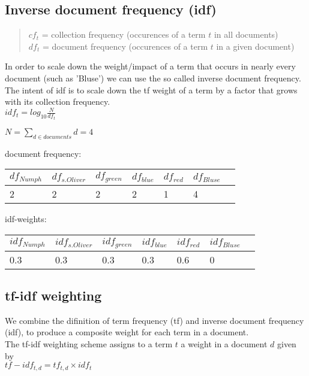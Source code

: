 \subsection{Inverse document frequency (idf)}
\begin{quote}
    $cf_t$ = collection frequency (occurences of a term $t$ in all documents)\\
    $df_t$ = document frequency (occurences of a term $t$ in a given document)
\end{quote}
In order to scale down the weight/impact of a term that occurs in nearly every document (such as 'Bluse') we can use the so called inverse document frequency.\\
The intent of idf is to scale down the tf weight of a term by a factor that grows with its collection frequency.\\

$idf_t = log_{10}\frac{N}{df_{t}}$

\bigskip
$N = \displaystyle\sum_{d \in documents}{d} = 4$

\bigskip
\noindent
document frequency:\\
\begin{tabular}{ l l l l l l l }
    \textbf{$df_{Numph}$} & \textbf{$df_{s.Oliver}$} & \textbf{$df_{green}$} & \textbf{$df_{blue}$} & \textbf{$df_{red}$} & \textbf{$df_{Bluse}$}\\\hline
    2                     & 2                        & 2                     & 2                    & 1                   & 4\\
\end{tabular}

\bigskip
\noindent
idf-weights:\\
\begin{tabular}{ l l l l l l l }
    \textbf{$idf_{Numph}$} & \textbf{$idf_{s.Oliver}$} & \textbf{$idf_{green}$} & \textbf{$idf_{blue}$} & \textbf{$idf_{red}$} & \textbf{$idf_{Bluse}$}\\\hline
    0.3                    & 0.3                       & 0.3                    & 0.3                   & 0.6                  & 0
\end{tabular}


\subsection{tf-idf weighting}
We combine the difinition of term frequency (tf) and inverse document frequency (idf), to produce a composite weight for each term in a document.\\
The tf-idf weighting scheme assigns to a term $t$ a weight in a document $d$ given by\\

$tf-idf_{t,d}= tf_{t,d} \times idf_t$











